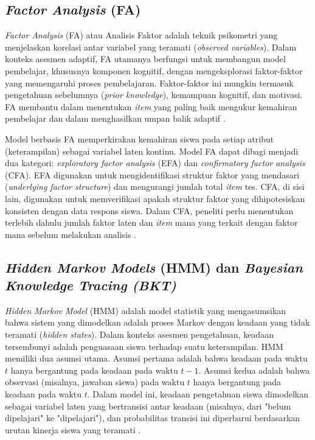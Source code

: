 \subsection{\textit{Factor Analysis} (FA)}
\textit{Factor Analysis} (FA) atau Analisis Faktor adalah teknik psikometri
yang menjelaskan korelasi antar variabel yang teramati
(\textit{observed variables}). Dalam konteks
asesmen adaptif, FA utamanya berfungsi untuk membangun model pembelajar,
khususnya komponen kognitif, dengan mengeksplorasi faktor-faktor yang
memengaruhi proses pembelajaran. Faktor-faktor ini mungkin termasuk
pengetahuan sebelumnya (\textit{prior knowledge}), kemampuan kognitif,
dan motivasi. FA membantu dalam menentukan \textit{item}
yang paling baik mengukur kemahiran pembelajar dan dalam menghasilkan umpan
balik adaptif \autocite{Ihichr2024}.

Model berbasis FA memperkirakan kemahiran siswa pada setiap
atribut (keterampilan) sebagai variabel laten kontinu.
Model FA dapat dibagi menjadi dua kategori: \textit{exploratory factor
analysis} (EFA) dan \textit{confirmatory factor analysis} (CFA). EFA
digunakan untuk mengidentifikasi struktur faktor yang mendasari
(\textit{underlying factor structure}) dan mengurangi jumlah total
\textit{item} tes. CFA, di sisi lain, digunakan untuk memverifikasi
apakah struktur faktor yang dihipotesiskan konsisten dengan data
respons siswa. Dalam CFA, peneliti perlu menentukan
terlebih dahulu jumlah faktor laten dan \textit{item} mana yang terkait
dengan faktor mana sebelum melakukan analisis \autocite{Minn2022}.

\subsection{\textit{Hidden Markov Models} (HMM) dan \textit{Bayesian Knowledge Tracing (BKT)}}
\textit{Hidden Markov Model} (HMM) adalah model statistik yang mengasumsikan
bahwa sistem yang dimodelkan adalah proses Markov dengan keadaan yang tidak
teramati (\textit{hidden states}). Dalam konteks asesmen
pengetahuan, keadaan tersembunyi adalah penguasaan siswa terhadap suatu
keterampilan. HMM memiliki dua asumsi utama. Asumsi pertama adalah bahwa
keadaan pada waktu $t$ hanya bergantung pada keadaan pada waktu $t-1$.
Asumsi kedua adalah bahwa observasi (misalnya, jawaban siswa) pada waktu $t$
hanya bergantung pada keadaan pada waktu $t$. Dalam model
ini, keadaan pengetahuan siswa dimodelkan sebagai variabel laten yang bertransisi
antar keadaan (misalnya, dari "belum dipelajari" ke "dipelajari"), dan
probabilitas transisi ini diperbarui berdasarkan urutan kinerja siswa
yang teramati \autocite{Minn2022}.

